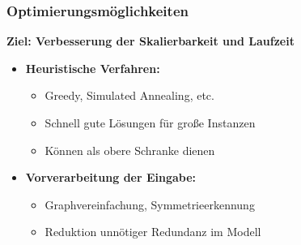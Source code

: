 \documentclass[9pt]{beamer}
\begin{document}
    \begin{frame}
    \frametitle{Optimierungsmöglichkeiten}
    \textbf{Ziel: Verbesserung der Skalierbarkeit und Laufzeit}
    \begin{itemize}
        \item \textbf{Heuristische Verfahren:}
        \begin{itemize}
            \item Greedy, Simulated Annealing, etc.
            \item Schnell gute Lösungen für große Instanzen
            \item Können als obere Schranke dienen
        \end{itemize}
        \item \textbf{Vorverarbeitung der Eingabe:}
        \begin{itemize}
            \item Graphvereinfachung, Symmetrieerkennung
            \item Reduktion unnötiger Redundanz im Modell
        \end{itemize}
    \end{itemize}
\end{frame}
\end{document}
